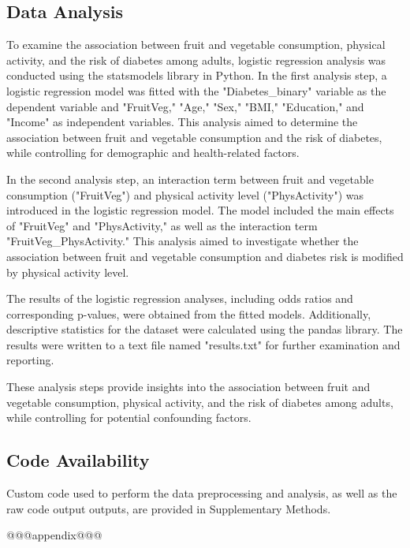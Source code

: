 \documentclass[11pt]{article}
\begin{document}
\subsection*{Data Analysis}
To examine the association between fruit and vegetable consumption, physical activity, and the risk of diabetes among adults, logistic regression analysis was conducted using the statsmodels library in Python. In the first analysis step, a logistic regression model was fitted with the "Diabetes\_binary" variable as the dependent variable and "FruitVeg," "Age," "Sex," "BMI," "Education," and "Income" as independent variables. This analysis aimed to determine the association between fruit and vegetable consumption and the risk of diabetes, while controlling for demographic and health-related factors.

In the second analysis step, an interaction term between fruit and vegetable consumption ("FruitVeg") and physical activity level ("PhysActivity") was introduced in the logistic regression model. The model included the main effects of "FruitVeg" and "PhysActivity," as well as the interaction term "FruitVeg\_PhysActivity." This analysis aimed to investigate whether the association between fruit and vegetable consumption and diabetes risk is modified by physical activity level.

The results of the logistic regression analyses, including odds ratios and corresponding p-values, were obtained from the fitted models. Additionally, descriptive statistics for the dataset were calculated using the pandas library. The results were written to a text file named "results.txt" for further examination and reporting. 

These analysis steps provide insights into the association between fruit and vegetable consumption, physical activity, and the risk of diabetes among adults, while controlling for potential confounding factors.\subsection*{Code Availability}

Custom code used to perform the data preprocessing and analysis, as well as the raw code output outputs, are provided in Supplementary Methods.




\clearpage
\appendix
@@@appendix@@@
\end{document}
